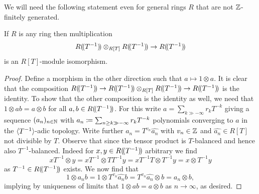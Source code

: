 We will need the following statement even for general rings $R$ that are not ${\mathbb{Z}}$-finitely generated.
\begin{lemma}
	\label{lemma: formal Laurent series are idempotent}
	
	If $R$ is any ring then multiplication 
	$${R(\!(T^{-1})\!)}\otimes_{R[T]}{R(\!(T^{-1})\!)}\to {R(\!(T^{-1})\!)}$$
is an $R[T]$-module isomorphism.
\end{lemma}
\begin{proof}
	Define a morphism in the other direction such that $a\mapsto 1\otimes a$. It is clear that the composition $\laurent{R}{T^{-1}} \to \laurent{R}{T^{-1}}\otimes_{R[T]} \laurent{R}{T^{-1}}\to \laurent{R}{T^{-1}}$ is the identity. To show that the other composition is the identity as well, we need that $1\otimes ab = a\otimes b$ for all $a, b\in {R(\!(T^{-1})\!)}$. For this write $a = \sum_{k\gg -\infty} r_k T^{-k}$ giving a sequence $(a_n)_{n\in {\mathbb{N}}}$ with $a_n \coloneqq \sum_{n \ge k \gg -\infty} r_k T^{-k}$ polynomials converging to $a$ in the ${\langle T^{-1}\rangle}$-adic topology. Write further $a_n = T^{v_n} \hat{a_n}$ with $v_n\in {\mathbb{Z}}$ and $\hat{a_n} \in R[T]$ not divisible by $T$. Observe that since the tensor product is $T$-balanced and hence also $T^{-1}$-balanced. Indeed for $x,y \in {R(\!(T^{-1})\!)}$ arbitrary we find
	$$xT^{-1}\otimes y = xT^{-1}\otimes TT^{-1}y = xT^{-1}T\otimes T^{-1}y = x\otimes T^{-1}y$$
	as $T^{-1} \in {R(\!(T^{-1})\!)}$ exists. We now find that
	$$1\otimes a_nb = 1\otimes T^{v_n} \hat{a_n} b = T^{v_n} \hat{a_n} \otimes b = a_n\otimes b,$$
	implying by uniqueness of limits that $1\otimes ab = a\otimes b$ as $n\to \infty$, as desired.
\end{proof}

